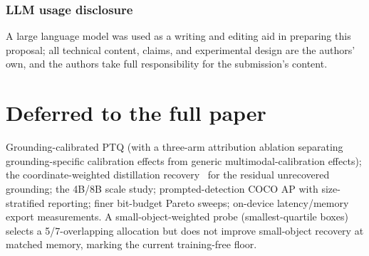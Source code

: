 \documentclass{article}
\begin{document}
\subsubsection*{LLM usage disclosure}
A large language model was used as a writing and editing aid in preparing this proposal; all technical content, claims, and experimental design are the authors' own, and the authors take full responsibility for the submission's content.

\appendix
\section{Deferred to the full paper}
Grounding-calibrated PTQ (with a three-arm attribution ablation separating grounding-specific calibration effects from generic multimodal-calibration effects); the coordinate-weighted distillation recovery~\cite{locdistill} for the residual unrecovered grounding; the 4B/8B scale study; prompted-detection COCO AP with size-stratified reporting; finer bit-budget Pareto sweeps; on-device latency/memory export measurements. A small-object-weighted probe (smallest-quartile boxes) selects a 5/7-overlapping allocation but does not improve small-object recovery at matched memory, marking the current training-free floor.
\end{document}
